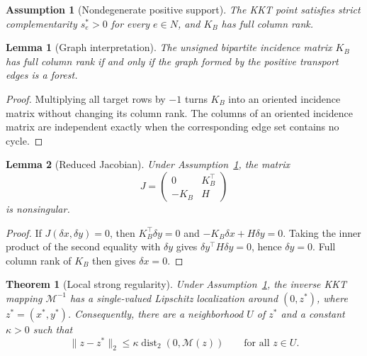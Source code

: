 \documentclass[11pt]{article}
\newtheorem{assumption}{Assumption}
\newtheorem{lemma}{Lemma}
\newtheorem{theorem}{Theorem}
\newcommand{\dist}{\operatorname{dist}}
\begin{document}
\begin{assumption}[Nondegenerate positive support]\label{ass:nondegenerate}
The KKT point satisfies strict complementarity $s_e^*>0$ for every $e\in N$, and $K_B$ has full column rank.
\end{assumption}

\begin{lemma}[Graph interpretation]
The unsigned bipartite incidence matrix $K_B$ has full column rank if and only if the graph formed by the positive transport edges is a forest.
\end{lemma}

\begin{proof}
Multiplying all target rows by $-1$ turns $K_B$ into an oriented incidence matrix without changing its column rank.
The columns of an oriented incidence matrix are independent exactly when the corresponding edge set contains no cycle.
\end{proof}

\begin{lemma}[Reduced Jacobian]\label{lem:reduced-jacobian}
Under Assumption~\ref{ass:nondegenerate}, the matrix
$$J=\begin{pmatrix}0&K_B^\top\\-K_B&H\end{pmatrix}$$
is nonsingular.
\end{lemma}

\begin{proof}
If $J(\delta x,\delta y)=0$, then $K_B^\top\delta y=0$ and $-K_B\delta x+H\delta y=0$.
Taking the inner product of the second equality with $\delta y$ gives $\delta y^\top H\delta y=0$, hence $\delta y=0$.
Full column rank of $K_B$ then gives $\delta x=0$.
\end{proof}

\begin{theorem}[Local strong regularity]\label{thm:strong-regularity}
Under Assumption~\ref{ass:nondegenerate}, the inverse KKT mapping $\mathcal M^{-1}$ has a single-valued Lipschitz localization around $(0,z^*)$, where $z^*=(x^*,y^*)$.
Consequently, there are a neighborhood $U$ of $z^*$ and a constant $\kappa>0$ such that
$$\lVert z-z^*\rVert_2\leq\kappa\dist_2(0,\mathcal M(z))\qquad\text{for all }z\in U.$$
\end{theorem}
\end{document}

